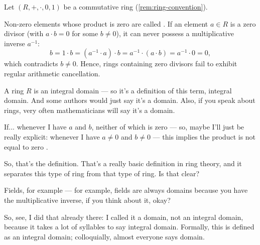 \begin{content}
Let $(R, +, \cdot, 0, 1)$ be a commutative ring (\cref{rem:ring-convention}).


\begin{steps}
Non-zero elements whose product is zero are called . If an element $a \in R$ is a zero divisor (with $a \cdot b = 0$ for some $b \neq 0$), it can never possess a multiplicative inverse $a^{-1}$:
\[
b = 1 \cdot b = (a^{-1} \cdot a) \cdot b = a^{-1} \cdot (a \cdot b) = a^{-1} \cdot 0 = 0,
\]
which contradicts $b \neq 0$. Hence, rings containing zero divisors fail to exhibit regular arithmetic cancellation.
\end{steps}
\end{content}

\begin{speech}[00:12:35 - 00:14:26]
A ring $R$ is an integral domain  --- so it's a definition of this term, integral domain. And some authors would just say it's a domain. Also, if you speak about rings, very often mathematicians will say it's a domain.

If... whenever I have $a$ and $b$, neither of which is zero --- so, maybe I'll just be really explicit: whenever I have $a \neq 0$ and $b \neq 0$  --- this implies the product is not equal to zero .

So, that's the definition. That's a really basic definition in ring theory, and it separates this type of ring from that type of ring. Is that clear?

Fields, for example --- for example, fields are always domains  because you have the multiplicative inverse, if you think about it, okay?

So, see, I did that already there: I called it a domain, not an integral domain, because it takes a lot of syllables to say integral domain. Formally, this is defined as an integral domain; colloquially, almost everyone says domain.
\end{speech}

